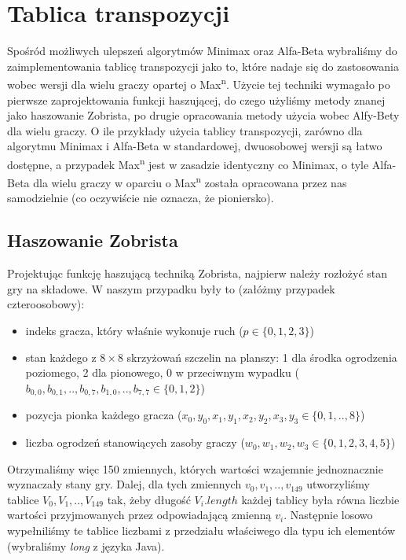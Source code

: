 \documentclass{pracamgr}
\begin{document}
\section{Tablica transpozycji}

Spośród możliwych ulepszeń algorytmów Minimax oraz Alfa-Beta wybraliśmy do zaimplementowania tablicę transpozycji jako to, które nadaje się do zastosowania wobec wersji dla wielu graczy opartej o Max\textsuperscript{n}.
Użycie tej techniki wymagało po pierwsze zaprojektowania funkcji haszującej, do czego użyliśmy metody znanej jako haszowanie Zobrista, po drugie opracowania metody użycia wobec Alfy-Bety dla wielu graczy.
O ile przykłady użycia tablicy transpozycji, zarówno dla algorytmu Minimax i Alfa-Beta w standardowej, dwuosobowej wersji są łatwo dostępne, a przypadek Max\textsuperscript{n} jest w zasadzie identyczny co Minimax, o tyle Alfa-Beta dla wielu graczy w oparciu o Max\textsuperscript{n} została opracowana przez nas samodzielnie (co oczywiście nie oznacza, że pioniersko).

\subsection{Haszowanie Zobrista}

Projektując funkcję haszującą techniką Zobrista, najpierw należy rozłożyć stan gry na składowe.
W naszym przypadku były to (załóżmy przypadek czteroosobowy):

\begin{itemize}
\item indeks gracza, który właśnie wykonuje ruch (\(p \in \{0, 1, 2, 3\}\))
\item stan każdego z \(8 \times 8\) skrzyżowań szczelin na planszy: 1 dla środka ogrodzenia poziomego, 2 dla pionowego, 0 w przeciwnym wypadku (\( b_{0, 0}, b_{0, 1}, .., b_{0, 7}, b_{1, 0}, .., b_{7, 7} \in \{0, 1, 2\}\))
\item pozycja pionka każdego gracza (\(x_0, y_0, x_1, y_1, x_2, y_2, x_3, y_3 \in \{0, 1, .., 8\}\))
\item liczba ogrodzeń stanowiących zasoby graczy (\(w_0, w_1, w_2, w_3 \in \{0, 1, 2, 3, 4, 5\}\))
\end {itemize}

Otrzymaliśmy więc 150 zmiennych, których wartości wzajemnie jednoznacznie wyznaczały stany gry.
Dalej, dla tych zmiennych \(v_0, v_1, .., v_{149}\) utworzyliśmy tablice \(V_0, V_1, .., V_{149}\) tak, żeby długość \(V_i.length\) każdej tablicy była równa liczbie wartości przyjmowanych przez odpowiadającą zmienną \(v_i\).
Następnie losowo wypełniliśmy te tablice liczbami z przedziału właściwego dla typu ich elementów (wybraliśmy \emph{long} z języka Java).
\end{document}
